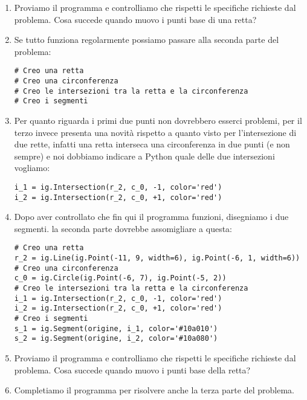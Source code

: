 \begin{enumerate} [noitemsep]
\item Proviamo il programma e controlliamo che rispetti le specifiche richieste
dal problema. Cosa succede quando muovo i punti base di una retta?

\item Se tutto funziona regolarmente possiamo passare alla seconda parte
del problema:

\begin{lstlisting}
# Creo una retta
# Creo una circonferenza
# Creo le intersezioni tra la retta e la circonferenza
# Creo i segmenti
\end{lstlisting}

\item Per quanto riguarda i primi due punti non dovrebbero esserci problemi,
per il terzo invece presenta una novità rispetto a quanto visto per
l'intersezione di due rette, infatti una retta interseca una circonferenza
in due punti (e non sempre) e noi dobbiamo indicare a Python quale delle
due intersezioni vogliamo:

\begin{lstlisting}
i_1 = ig.Intersection(r_2, c_0, -1, color='red')
i_2 = ig.Intersection(r_2, c_0, +1, color='red')
\end{lstlisting}

\item Dopo aver controllato che fin qui il programma funzioni, disegniamo i due
segmenti. la seconda parte dovrebbe assomigliare a questa:

\begin{lstlisting}
# Creo una retta
r_2 = ig.Line(ig.Point(-11, 9, width=6), ig.Point(-6, 1, width=6))
# Creo una circonferenza
c_0 = ig.Circle(ig.Point(-6, 7), ig.Point(-5, 2))
# Creo le intersezioni tra la retta e la circonferenza
i_1 = ig.Intersection(r_2, c_0, -1, color='red')
i_2 = ig.Intersection(r_2, c_0, +1, color='red')
# Creo i segmenti
s_1 = ig.Segment(origine, i_1, color='#10a010')
s_2 = ig.Segment(origine, i_2, color='#10a080')
\end{lstlisting}

\item Proviamo il programma e controlliamo che rispetti le specifiche richieste
dal problema. Cosa succede quando muovo i punti base della retta?

\item Completiamo il programma per risolvere anche la terza parte del problema.

\end{enumerate}

